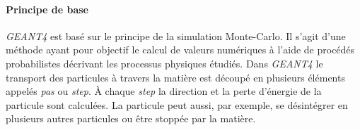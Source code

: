 %     
    \paragraph{Principe de base}

    \textit{GEANT4} est bas\'e sur le principe de la simulation Monte-Carlo. Il s'agit d'une m\'ethode ayant pour objectif le calcul de valeurs num\'eriques \`a l'aide de proc\'ed\'es probabilistes d\'ecrivant les processus physiques \'etudi\'es. Dans \textit{GEANT4} le transport des particules \`a travers la mati\`ere est d\'ecoup\'e en plusieurs \'el\'ements appel\'es \textit{pas} ou \textit{step}. \`A chaque \textit{step} la direction et la perte d'\'energie de la particule sont calcul\'ees. La particule peut aussi, par exemple, se d\'esint\'egrer en plusieurs autres particules ou être stopp\'ee par la mati\`ere. \\
    
